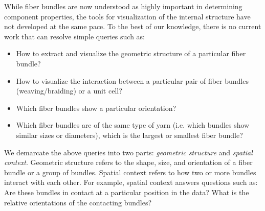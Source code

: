 %
%
%
While fiber bundles are now understood as highly important in determining component properties, the tools for visualization of the internal structure have not developed at the same pace.
To the best of our knowledge, there is no current work that can resolve simple queries such as:
\begin{itemize}[noitemsep]
\item{ How to extract and visualize the geometric structure of a particular fiber bundle?}
\item{ How to visualize the interaction between a particular pair of fiber bundles (weaving/braiding) or a unit cell?}
\item{ Which fiber bundles show a particular orientation? }
\item{ Which fiber bundles are of the same type of yarn (i.e. which bundles show similar sizes or diameters), which is the largest or smallest fiber bundle?}
\end{itemize}

 We demarcate the above queries into two parts: \textit{geometric structure} and \textit{spatial context}. Geometric structure refers to the shape, size, and orientation of a fiber bundle or a group of bundles. Spatial context refers to how two or more bundles interact with each other. For example, spatial context answers questions such as: Are these bundles in contact at a particular position in the data? What is the relative orientations of the contacting bundles? 
 
